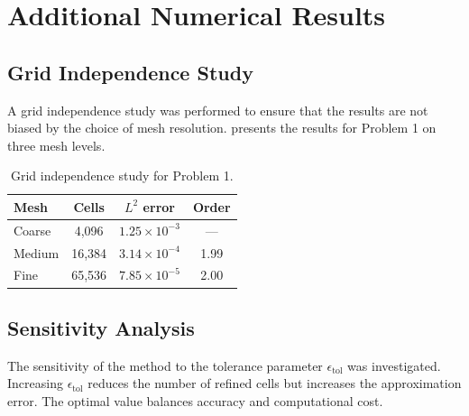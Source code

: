 \chapter{Additional Numerical Results}
\label{app:additional}

\section{Grid Independence Study}
\label{sec:app:gridindependence}

A grid independence study was performed to ensure that the results are not biased by the choice of mesh resolution.  presents the results for Problem 1 on three mesh levels.

\begin{table}[htbp]
    \centering
    \caption{Grid independence study for Problem 1.}
    \label{tab:gridindependence}
    \begin{tabular}{@{}lccc@{}}
        \toprule
        \textbf{Mesh} & \textbf{Cells} & \textbf{$L^2$ error} & \textbf{Order} \\
        \midrule
        Coarse   & 4,096    & $1.25 \times 10^{-3}$ & --- \\
        Medium   & 16,384   & $3.14 \times 10^{-4}$ & 1.99 \\
        Fine     & 65,536   & $7.85 \times 10^{-5}$ & 2.00 \\
        \bottomrule
    \end{tabular}
\end{table}

\section{Sensitivity Analysis}
\label{sec:app:sensitivity}

The sensitivity of the method to the tolerance parameter $\epsilon_{\text{tol}}$ was investigated. Increasing $\epsilon_{\text{tol}}$ reduces the number of refined cells but increases the approximation error. The optimal value balances accuracy and computational cost.


